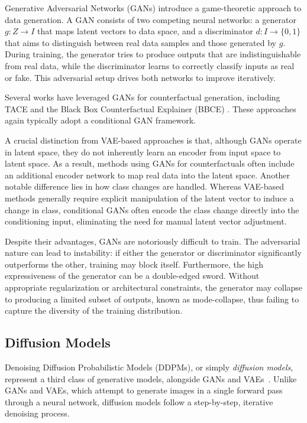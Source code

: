 Generative Adversarial Networks (GANs) \cite{goodfellow2020generative} introduce a game-theoretic approach to data generation.
A GAN consists of two competing neural networks: a generator $g : Z \to I$ that maps latent vectors to data space,
and a discriminator $d : I \to \{0,1\}$ that aims to distinguish between real data samples and those generated by $g$.
During training, the generator tries to produce outputs that are indistinguishable from real data, while the discriminator learns to correctly classify inputs as real or fake.
This adversarial setup drives both networks to improve iteratively.

Several works have leveraged GANs for counterfactual generation, including TACE \cite{rossi2024tace}
and the Black Box Counterfactual Explainer (BBCE) \cite{singla2023explaining}. These approaches again typically adopt a conditional GAN framework.

A crucial distinction from VAE-based approaches is that, although GANs operate in latent space, they do not inherently learn an encoder from input space to latent space.
As a result, methods using GANs for counterfactuals often include an additional encoder network to map real data into the latent space.
Another notable difference lies in how class changes are handled. Whereas VAE-based methods generally require explicit manipulation of the latent vector to induce a change in class,
conditional GANs often encode the class change directly into the conditioning input, eliminating the need for manual latent vector adjustment.

Despite their advantages, GANs are notoriously difficult to train. The adversarial nature can lead to instability: if either the generator or discriminator significantly outperforms the other, training may block itself.
Furthermore, the high expressiveness of the generator can be a double-edged sword. Without appropriate regularization or architectural constraints, the generator may collapse to producing a limited subset of outputs, known as mode-collapse, thus failing to capture the diversity of the training distribution.

\subsection{Diffusion Models}

Denoising Diffusion Probabilistic Models (DDPMs), or simply \emph{diffusion models}, represent a third class of generative models, alongside GANs and VAEs~\cite{ho2020denoising}.
Unlike GANs and VAEs, which attempt to generate images in a single forward pass through a neural network, diffusion models follow a step-by-step, iterative denoising process.

